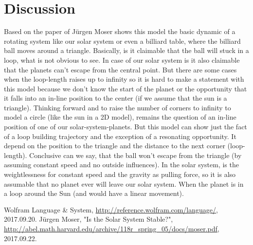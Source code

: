 \documentclass[11pt,a4paper]{article}
\begin{document}
\section{Discussion}
Based on the paper of J{\"u}rgen Moser \cite{moser} shows this model the basic dynamic of a rotating system like our solar system or even a billiard table, where the billiard ball moves around a triangle. Basically, is it claimable that the ball will stuck in a loop, what is not obvious to see. In case of our solar system is it also claimable that the planets can’t escape from the central point. But there are some cases when the loop-length raises up to infinity so it is hard to make a statement with this model because we don’t know the start of the planet or the opportunity that it falls into an in-line position to the center (if we assume that the sun is a triangle). Thinking forward and to raise the number of corners to infinity to model a circle (like the sun in a 2D model), remains the question of an in-line position of one of our solar-system-planets. But this model can show just the fact of a loop building trajectory and the exception of a resonating opportunity. It depend on the position to the triangle and the distance to the next corner (loop-length). Conclusive can we say, that the ball won't escape from the triangle (by assuming constant speed and no outside influences). In the solar system, is the weightlessness for constant speed and the gravity as pulling force, so it is also assumable that no planet ever will leave our solar system. When the planet is in a loop around the Sun (and would have a linear movement).

\listoffigures

\begin{thebibliography}{2}

 Wolfram Language \& System, \url{http://reference.wolfram.com/language/}, 2017.09.20.
  J{\"u}rgen Moser, "Is the Solar System Stable?", \url{http://abel.math.harvard.edu/archive/118r_spring_05/docs/moser.pdf}, 2017.09.22.

\end{thebibliography}
\end{document}
